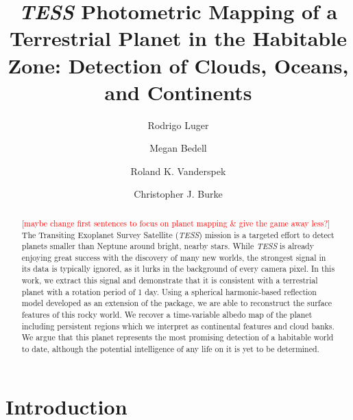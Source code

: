 \documentclass[modern]{aastex62}
\newcommand{\TESS}{\emph{TESS}\xspace}
\newcommand{\todo}[1]{\textcolor{red}{#1}}
\begin{document}
\title{\TESS Photometric Mapping of a Terrestrial Planet in the Habitable Zone: 
       Detection of Clouds, Oceans, and Continents}

\author[0000-0002-0296-3826]{Rodrigo Luger}
%
\author[0000-0002-9328-5652]{Megan Bedell}
%
\author{Roland K. Vanderspek}
%
\author{Christopher J. Burke}

\begin{abstract}
\todo{[maybe change first sentences to focus on planet mapping \& give the game 
away less?]} The Transiting Exoplanet Survey Satellite (\TESS) mission is a 
targeted effort to detect planets smaller than Neptune around bright, nearby stars. 
While \TESS is already enjoying great success with the discovery of many new worlds, 
the strongest signal in its data is typically ignored, as it lurks in the background 
of every camera pixel. In this work, we extract this signal and demonstrate that 
it is consistent with a terrestrial planet with a rotation period of 1 day. 
Using a spherical harmonic-based reflection model developed as an extension of 
the \starry package, we are able to reconstruct the surface features of this rocky 
world. We recover a time-variable albedo map of the planet including persistent 
regions which we interpret as continental features and cloud banks. 
We argue that this planet represents the most promising detection of a habitable 
world to date, although the potential intelligence of any life on it is yet to 
be determined.
\end{abstract}


\section{Introduction}
\label{sec:intro}
\end{document}
